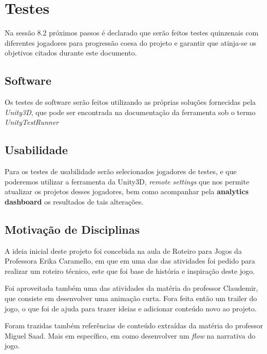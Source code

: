 \section{Testes}

Na sessão 8.2 próximos passos é declarado que serão feitos testes quinzenais com diferentes jogadores para progressão coesa do projeto e garantir que atinja-se os objetivos citados durante este documento. 

\subsection{Software}

Os testes de software serão feitos utilizando as próprias soluções fornecidas pela \textit{Unity3D}, que pode ser encontrada na documentação da ferramenta sob o termo \textit{UnityTestRunner}

\subsection{Usabilidade}

Para os testes de usabilidade serão selecionados jogadores de testes, e que poderemos utilizar a ferramenta da Unity3D, \textit{remote settings} que nos permite atualizar os projetos desses jogadores, bem como acompanhar pela \textbf{analytics dashboard} os resultados de tais alterações.

\subsection{Motivação de Disciplinas}

A ideia inicial deste projeto foi concebida na aula de Roteiro para Jogos da Professora Erika Caramello, em que em uma das das atividades foi pedido para realizar um roteiro técnico, este que foi base de história e inspiração deste jogo. 

Foi aproveitada também uma das atividades da matéria do professor Claudemir, que consiste em desenvolver uma animação curta. Fora feita então um trailer do jogo, o que foi de ajuda para trazer ideias e adicionar conteúdo novo ao projeto.

Foram trazidas também referências de conteúdo extraídas da matéria do professor Miguel Saad. Mais em específico, em como desenvolver um \textit{flow} na narrativa do jogo.




